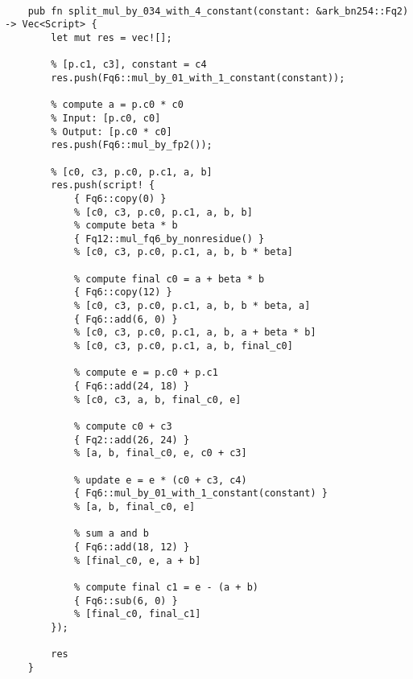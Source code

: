 \begin{lstlisting}

    pub fn split_mul_by_034_with_4_constant(constant: &ark_bn254::Fq2) -> Vec<Script> {
        let mut res = vec![];

        % [p.c1, c3], constant = c4
        res.push(Fq6::mul_by_01_with_1_constant(constant));

        % compute a = p.c0 * c0
        % Input: [p.c0, c0]
        % Output: [p.c0 * c0]
        res.push(Fq6::mul_by_fp2());

        % [c0, c3, p.c0, p.c1, a, b]
        res.push(script! {
            { Fq6::copy(0) }
            % [c0, c3, p.c0, p.c1, a, b, b]
            % compute beta * b
            { Fq12::mul_fq6_by_nonresidue() }
            % [c0, c3, p.c0, p.c1, a, b, b * beta]

            % compute final c0 = a + beta * b
            { Fq6::copy(12) }
            % [c0, c3, p.c0, p.c1, a, b, b * beta, a]
            { Fq6::add(6, 0) }
            % [c0, c3, p.c0, p.c1, a, b, a + beta * b]
            % [c0, c3, p.c0, p.c1, a, b, final_c0]

            % compute e = p.c0 + p.c1
            { Fq6::add(24, 18) }
            % [c0, c3, a, b, final_c0, e]

            % compute c0 + c3
            { Fq2::add(26, 24) }
            % [a, b, final_c0, e, c0 + c3]

            % update e = e * (c0 + c3, c4)
            { Fq6::mul_by_01_with_1_constant(constant) }
            % [a, b, final_c0, e]

            % sum a and b
            { Fq6::add(18, 12) }
            % [final_c0, e, a + b]

            % compute final c1 = e - (a + b)
            { Fq6::sub(6, 0) }
            % [final_c0, final_c1]
        });

        res
    }

\end{lstlisting}
